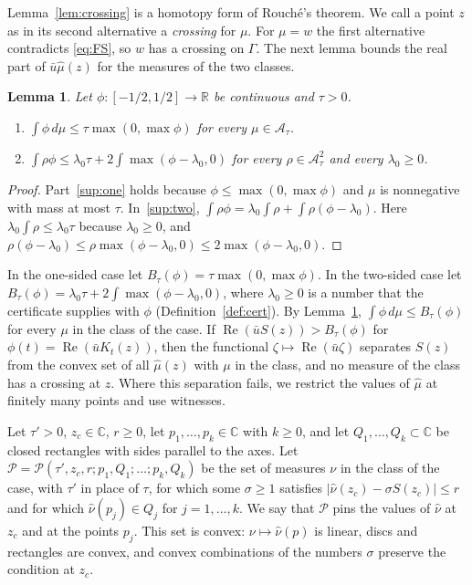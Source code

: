 \documentclass[11pt]{amsart}
\newtheorem{lemma}[theorem]{Lemma}
\theoremstyle{definition}
\theoremstyle{remark}
\numberwithin{equation}{section}
\newcommand{\R}{\mathbb{R}}
\newcommand{\C}{\mathbb{C}}
\newcommand{\re}{\operatorname{Re}}
\begin{document}
Lemma~\ref{lem:crossing} is a homotopy form of Rouch\'e's theorem. We call a point $z$ as in its second alternative a \emph{crossing} for $\mu$. For $\mu=w$ the first alternative contradicts \eqref{eq:FS}, so $w$ has a crossing on $\Gamma$. The next lemma bounds the real part of $\bar u\hat\mu(z)$ for the measures of the two classes.

\begin{lemma}\label{lem:support}
Let $\phi\colon[-1/2,1/2]\to\R$ be continuous and $\tau>0$.
\begin{enumerate}[label=(\alph*)]
\item\label{sup:one} $\int\phi\,d\mu\le\tau\max(0,\max\phi)$ for every $\mu\in\mathcal A_\tau$.
\item\label{sup:two} $\int\rho\phi\le\lambda_0\tau+2\int\max(\phi-\lambda_0,0)$ for every $\rho\in\mathcal A^2_\tau$ and every $\lambda_0\ge0$.
\end{enumerate}
\end{lemma}

\begin{proof}
Part~\ref{sup:one} holds because $\phi\le\max(0,\max\phi)$ and $\mu$ is nonnegative with mass at most $\tau$. In~\ref{sup:two}, $\int\rho\phi=\lambda_0\int\rho+\int\rho(\phi-\lambda_0)$. Here $\lambda_0\int\rho\le\lambda_0\tau$ because $\lambda_0\ge0$, and $\rho(\phi-\lambda_0)\le\rho\max(\phi-\lambda_0,0)\le2\max(\phi-\lambda_0,0)$.
\end{proof}

In the one-sided case let $B_\tau(\phi)=\tau\max(0,\max\phi)$. In the two-sided case let $B_\tau(\phi)=\lambda_0\tau+2\int\max(\phi-\lambda_0,0)$, where $\lambda_0\ge0$ is a number that the certificate supplies with $\phi$ (Definition~\ref{def:cert}). By Lemma~\ref{lem:support}, $\int\phi\,d\mu\le B_\tau(\phi)$ for every $\mu$ in the class of the case. If $\re(\bar uS(z))>B_\tau(\phi)$ for $\phi(t)=\re(\bar uK_t(z))$, then the functional $\zeta\mapsto\re(\bar u\zeta)$ separates $S(z)$ from the convex set of all $\hat\mu(z)$ with $\mu$ in the class, and no measure of the class has a crossing at $z$. Where this separation fails, we restrict the values of $\hat\mu$ at finitely many points and use witnesses.

Let $\tau'>0$, $z_c\in\C$, $r\ge0$, let $p_1,\dots,p_k\in\C$ with $k\ge0$, and let $Q_1,\dots,Q_k\subset\C$ be closed rectangles with sides parallel to the axes. Let $\mathcal P=\mathcal P(\tau',z_c,r;p_1,Q_1;\dots;p_k,Q_k)$ be the set of measures $\nu$ in the class of the case, with $\tau'$ in place of $\tau$, for which some $\sigma\ge1$ satisfies $|\hat\nu(z_c)-\sigma S(z_c)|\le r$ and for which $\hat\nu(p_j)\in Q_j$ for $j=1,\dots,k$. We say that $\mathcal P$ pins the values of $\hat\nu$ at $z_c$ and at the points $p_j$. This set is convex: $\nu\mapsto\hat\nu(p)$ is linear, discs and rectangles are convex, and convex combinations of the numbers $\sigma$ preserve the condition at $z_c$.
\end{document}
